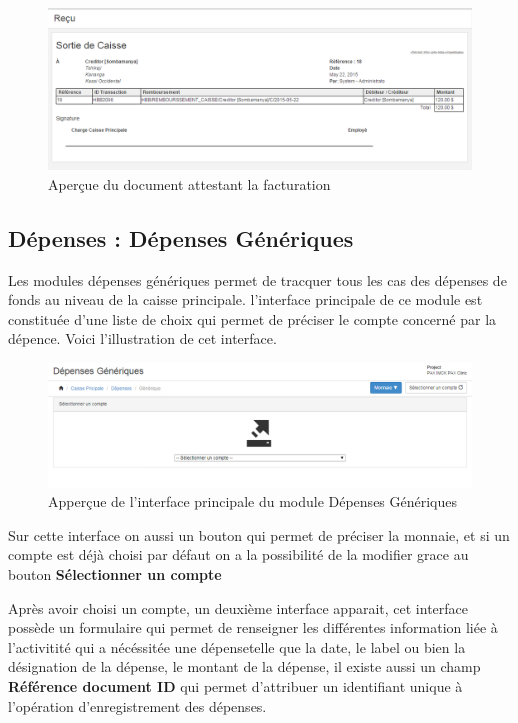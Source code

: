 \documentclass[12pt,a4paper]{report}
\begin{document}
\begin{figure}[h]
\begin{center}
\includegraphics[width=12cm]{pic/SortieCaisseInvoice.png}
\end{center}
\caption{Aperçue du document attestant la facturation}
\label{Aperçue du document attestant la facturation}
\end{figure}


\newpage
\subsection{Dépenses : Dépenses Génériques}
Les modules dépenses génériques permet de tracquer tous les cas des dépenses de fonds au niveau de la caisse principale. l'interface principale de ce module est constituée d'une liste de choix qui permet de préciser le compte concerné par la dépence.
Voici l'illustration de cet interface.

\begin{figure}[h]
\begin{center}
\includegraphics[width=14cm]{pic/DepenseGen.png}
\end{center}
\caption{Apperçue de l'interface principale du module Dépenses Génériques}
\label{Apperçue de l'interface principale du module Dépenses Génériques}
\end{figure}

Sur cette interface on aussi un bouton qui permet de préciser la monnaie, et si un compte est déjà choisi par défaut on a la possibilité de la modifier grace au bouton \textbf{Sélectionner un compte}

\newpage
Après avoir choisi un compte, un deuxième interface apparait, cet interface possède un formulaire qui permet de renseigner les différentes information liée à l'activitité qui a nécéssitée une dépensetelle que la date, le label ou bien la désignation de la dépense, le montant de la dépense, il existe aussi un champ \textbf{Référence document ID} qui permet d'attribuer un identifiant unique à l'opération d'enregistrement des dépenses.
\end{document}
